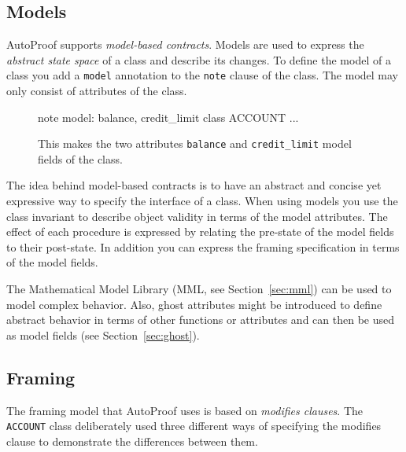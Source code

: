 \documentclass[a4paper,12pt]{article}
\newcommand{\AutoProof}{Auto\-Proof\xspace}
\newcommand{\e}[1]{\mbox{\lstinline[language=Eiffel]|#1|}}
\begin{document}
\subsection{Models}

\AutoProof supports \emph{model-based contracts}. Models are used to express the \emph{abstract state space} of a class and describe its changes. To define the model of a class you add a \e{model} annotation to the \e{note} clause of the class. The model may only consist of attributes of the class.

\begin{figure}
\begin{erunning}
note
	model: balance, credit_limit
class ACCOUNT ...
\end{erunning}
\hspace{0.5cm}
\caption*{This makes the two attributes \e{balance} and \e{credit_limit} model fields of the class.}
\end{figure}

The idea behind model-based contracts is to have an abstract and concise yet expressive way to specify the interface of a class. When using models you use the class invariant to describe object validity in terms of the model attributes. The effect of each procedure is expressed by relating the pre-state of the model fields to their post-state. In addition you can express the framing specification in terms of the model fields.

The Mathematical Model Library (MML, see Section~\ref{sec:mml}) can be used to model complex behavior. Also, ghost attributes might be introduced to define abstract behavior in terms of other functions or attributes and can then be used as model fields (see Section~\ref{sec:ghost}).


\subsection{Framing} \label{sec:framing}

The framing model that \AutoProof uses is based on \emph{modifies clauses}. The \e{ACCOUNT} class deliberately used three different ways of specifying the modifies clause to demonstrate the differences between them.
\end{document}

